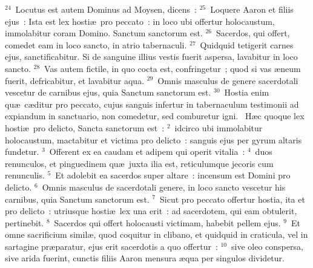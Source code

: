 ${}^{24}$~Locutus est autem Dominus ad Moysen, dicens~:
${}^{25}$~Loquere Aaron et filiis ejus~: Ista est lex hosti\ae\ pro peccato~: in loco ubi offertur holocaustum, immolabitur coram Domino. Sanctum sanctorum est.
${}^{26}$~Sacerdos, qui offert, comedet eam in loco sancto, in atrio tabernaculi.
${}^{27}$~Quidquid tetigerit carnes ejus, sanctificabitur. Si de sanguine illius vestis fuerit aspersa, lavabitur in loco sancto.
${}^{28}$~Vas autem fictile, in quo cocta est, confringetur~; quod si vas \ae neum fuerit, defricabitur, et lavabitur aqua.
${}^{29}$~Omnis masculus de genere sacerdotali vescetur de carnibus ejus, quia Sanctum sanctorum est.
${}^{30}$~Hostia enim qu\ae\ c\ae ditur pro peccato, cujus sanguis infertur in tabernaculum testimonii ad expiandum in sanctuario, non comedetur, sed comburetur igni.
~\lettrine[lines=10,image=true,loversize=0.05,lraise=-0.03]{H}{}\ae c quoque lex hosti\ae\ pro delicto, Sancta sanctorum est~:
${}^{2}$~idcirco ubi immolabitur holocaustum, mactabitur et victima pro delicto~: sanguis ejus per gyrum altaris fundetur.
${}^{3}$~Offerent ex ea caudam et adipem qui operit vitalia~:
${}^{4}$~duos renunculos, et pinguedinem qu\ae\ juxta ilia est, reticulumque jecoris cum renunculis.
${}^{5}$~Et adolebit ea sacerdos super altare~: incensum est Domini pro delicto.
${}^{6}$~Omnis masculus de sacerdotali genere, in loco sancto vescetur his carnibus, quia Sanctum sanctorum est.
${}^{7}$~Sicut pro peccato offertur hostia, ita et pro delicto~: utriusque hosti\ae\ lex una erit~: ad sacerdotem, qui eam obtulerit, pertinebit.
${}^{8}$~Sacerdos qui offert holocausti victimam, habebit pellem ejus.
${}^{9}$~Et omne sacrificium simil\ae , quod coquitur in clibano, et quidquid in craticula, vel in sartagine pr\ae paratur, ejus erit sacerdotis a quo offertur~:
${}^{10}$~sive oleo conspersa, sive arida fuerint, cunctis filiis Aaron mensura \ae qua per singulos dividetur.



